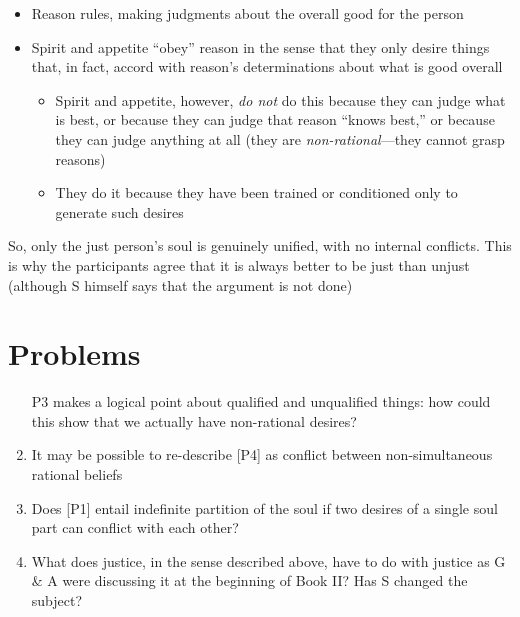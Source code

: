 \documentclass[oneside]{article}
\begin{document}
\begin{itemize}
\item{Reason rules, making judgments about the overall good for the person}
\item{Spirit and appetite ``obey'' reason in the sense that they only desire things that, in fact, accord with reason's determinations about what is good overall}
\begin{itemize}
\item{Spirit and appetite, however, \emph{do not} do this because they can judge what is best, or because they can judge that reason ``knows best,'' or because they can judge anything at all (they are \emph{non-rational}---they cannot grasp reasons)}
\item{They do it because they have been trained or conditioned only to generate such desires}
\end{itemize}\end{itemize}

\noindent So, only the just person's soul is genuinely unified, with no internal conflicts. This is why the participants agree that it is always better to be just than unjust (although S himself says that the argument is not done)

\section*{Problems}
\begin{enumerate}
\item [P3] makes a logical point about qualified and unqualified things: how could this show that we actually have non-rational desires?
\item It may be possible to re-describe [P4] as conflict between non-simultaneous rational beliefs
\item Does [P1] entail indefinite partition of the soul if two desires of a single soul part can conflict with each other?
\item What does justice, in the sense described above, have to do with justice as G \& A were discussing it at the beginning of Book II? Has S changed the subject?
\end{enumerate}
\end{document}
